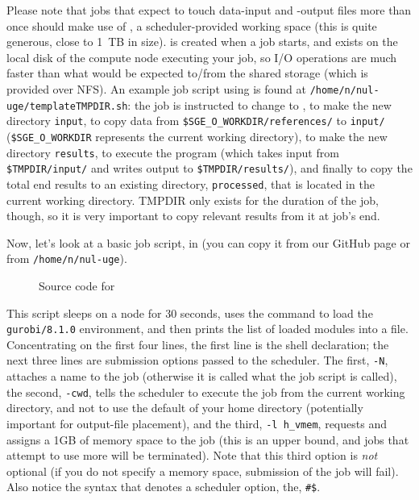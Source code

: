 \documentclass{easychair}
\begin{document}
Please note that jobs that expect to touch data-input and -output files
more than once should make use of , a scheduler-provided working
space (this is quite generous, close to 1~TB in size).  is created
when a job starts, and exists on the local disk of the compute node
executing your job, so I/O operations are much faster than what would be
expected to/from the shared storage (which is provided over NFS). An
example job script using  is found at
\texttt{/home/n/nul-uge/templateTMPDIR.sh}: the job is instructed to change to
, to make the new directory \texttt{input}, to copy data from
\texttt{\$SGE\_O\_WORKDIR/references/} to \texttt{input/} (\texttt{\$SGE\_O\_WORKDIR} represents the
current working directory), to make the new directory \texttt{results}, to
execute the program (which takes input from \texttt{\$TMPDIR/input/} and writes
output to \texttt{\$TMPDIR/results/}), and finally to copy the total end results
to an existing directory, \texttt{processed}, that is located in the current
working directory. TMPDIR only exists for the duration of the job, though,
so it is very important to copy relevant results from it at job's end.

Now, let's look at a basic job script,  in 
(you can copy it from our GitHub page or from \texttt{/home/n/nul-uge}).

\begin{figure}[htpb]
    
    \caption{Source code for }
	\label{fig:tcsh.sh}
\end{figure}

This script sleeps on a node for 30 seconds, uses the  command 
to load the \texttt{gurobi/8.1.0} environment, and then prints the list of 
loaded modules into a file. Concentrating on the first four lines, the first 
line is the shell declaration; the next three lines are submission options 
passed to the scheduler. The first, \texttt{-N}, attaches a name to the job
(otherwise it is called what the job script is called), the second, \texttt{-cwd},
tells the scheduler to execute the job from the current working 
directory, and not to use the default of your home directory (potentially 
important for output-file placement), and the third, \texttt{-l h\_vmem}, 
requests and assigns a 1GB of memory space to the job (this is an upper bound, and 
jobs that attempt to use more will be terminated). Note that this third 
option is \emph{not} optional (if you do not specify a memory space, 
submission of the job will fail). Also notice the syntax that denotes a 
scheduler option, the, \texttt{\#\$}.
\end{document}
